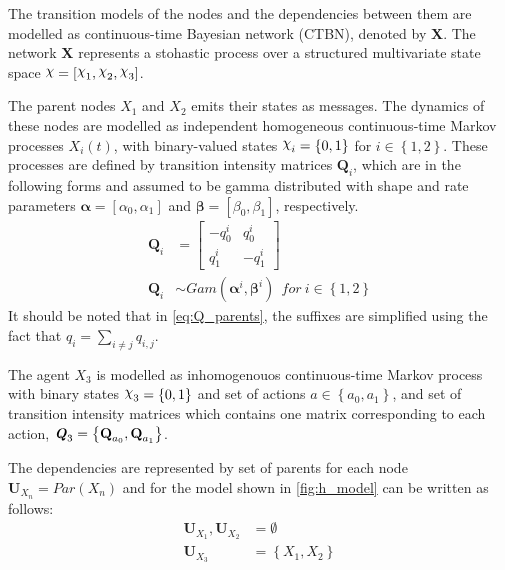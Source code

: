 The transition models of the nodes and the dependencies between them are modelled as continuous-time Bayesian network (CTBN), denoted by \textbf{X}. The network \textbf{X} represents a stohastic process over a structured multivariate state space $ \rchi = [\rchi_1, \rchi_2, \rchi_3] $. 

The parent nodes $X_{1}$ and $ X_{2} $ emits their states as messages. The dynamics  of these nodes are modelled as independent homogeneous continuous-time Markov processes $X_{i}(t)$, with binary-valued states $ \rchi_{i} = \left\lbrace 0, 1 \right\rbrace  $ for $ i \in \left\lbrace 1,2 \right\rbrace $. These processes are defined by transition intensity matrices $ \textbf{Q}_{i} $, which are in the following forms and assumed to be gamma distributed with shape and rate parameters $ \boldsymbol{\alpha} = [\alpha_0, \alpha_1] $ and $ \boldsymbol{\beta} = [\beta_0, \beta_1] $, respectively.
\begin{align}
\textbf{Q}_i &= 
\begin{bmatrix}
-q^i_{0} & q^i_{0} \\
q^i_{1} &  -q^i_{1}
\end{bmatrix}
\label{eq:Q_parents}\\
\textbf{Q}_{i} &\sim Gam(\boldsymbol{\alpha}^i, \boldsymbol{\beta}^i)\ \ for\ i \in \left\lbrace 1,2\right\rbrace \nonumber
\end{align}
It should be noted that in \autoref{eq:Q_parents}, the suffixes are simplified using the fact that $ q_{i} = \sum_{i \neq j} q_{i,j}$.

The agent  $ X_{3} $ is modelled as inhomogenouos continuous-time Markov process with binary states $ \rchi_{3} = \left\lbrace 0, 1 \right\rbrace  $ and set of actions $ a \in \left\lbrace a_0, a_1\right\rbrace  $, and set of transition intensity matrices which contains one matrix corresponding to each action, $ \textbf{\textit{Q}}_{3} = \left\lbrace \textbf{Q}_{a_{0}}, \textbf{Q}_{a_{1}} \right\rbrace $.

The dependencies are represented by set of parents for each node $ \textbf{U}_{X_{n}} = Par(X_n) $ and for the model shown in \autoref{fig:h_model} can be written as follows:
\begin{align*}
\textbf{U}_{X_{1}}, \textbf{U}_{X_{2}} & = \emptyset \\
\textbf{U}_{X_{3}} & = \left\lbrace X_1, X_2 \right\rbrace 
\end{align*}

